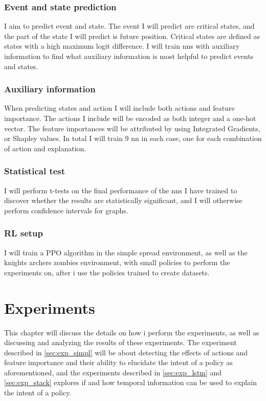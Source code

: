 \documentclass[UKenglish]{uiomasterthesis}
\begin{document}
\subsection{Event and state prediction}
I aim to predict event and state. The event I will predict are critical states, and the part of the state I will predict is future position. Critical states are defined as states with a high maximum logit difference. I will train \acp{nn} with auxiliary information to find what auxiliary information is most helpful to predict events and states. 

\subsection{Auxiliary information}
When predicting states and action I will include both actions and feature importance. The actions I include will be encoded as both integer and a one-hot vector. The feature importances will be attributed by using Integrated Gradients, or Shapley values. In total I will train 9 \ac{nn} in each case, one for each combination of action and explanation.

\subsection{Statistical test}
I will perform t-tests on the final performance of the \acp{nn} I have trained to discover whether the results are statistically significant, and I will otherwise perform confidence intervals for graphs.

\subsection{RL setup}
I will train a PPO algorithm in the simple spread environment, as well as the knights archers zombies environment, with small policies to perform the experiments on, after i use the policies trained to create datasets.


\chapter{Experiments}
\label{chap:exp}
This chapter will discuss the details on how i perform the experiments, as well as discussing and analyzing the results of these experiments. The experiment described in \cref{sec:exp_simpl} will be about detecting the effects of actions and feature importance and their ability to elucidate the intent of a policy as aforementioned, and the experiments described in \cref{sec:exp_lstm} and \cref{sec:exp_stack} explores if and how temporal information can be used to explain the intent of a policy.
\end{document}
